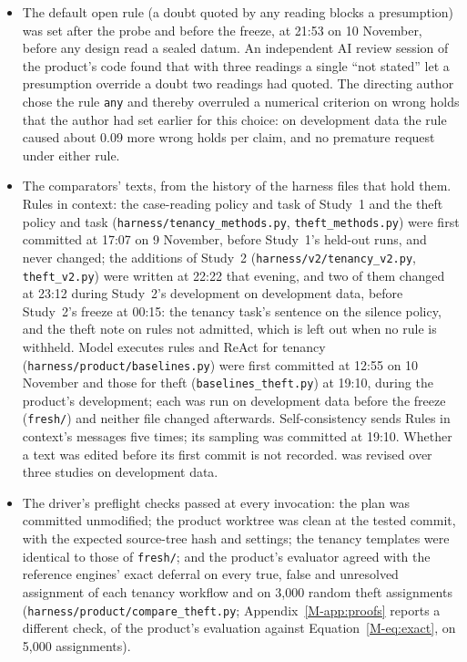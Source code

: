 \begin{itemize}[leftmargin=1.2em,itemsep=1pt]
\item The default open rule (a doubt quoted by any reading blocks a presumption) was set after the probe and before the freeze, at 21:53 on 10 November, before any design read a sealed datum. An independent AI review session of the product's code found that with three readings a single ``not stated'' let a presumption override a doubt two readings had quoted. The directing author chose the rule \texttt{any} and thereby overruled a numerical criterion on wrong holds that the author had set earlier for this choice: on development data the rule caused about 0.09 more wrong holds per claim, and no premature request under either rule.
\item The comparators' texts, from the history of the harness files that hold them. Rules in context: the case-reading policy and task of Study~1 and the theft policy and task (\texttt{harness/\allowbreak{}tenancy\_\allowbreak{}methods.py}, \texttt{theft\_methods.py}) were first committed at 17:07 on 9 November, before Study~1's held-out runs, and never changed; the additions of Study~2 (\texttt{harness/\allowbreak{}v2/\allowbreak{}tenancy\_\allowbreak{}v2.py}, \texttt{theft\_v2.py}) were written at 22:22 that evening, and two of them changed at 23:12 during Study~2's development on development data, before Study~2's freeze at 00:15: the tenancy task's sentence on the silence policy, and the theft note on rules not admitted, which is left out when no rule is withheld. Model executes rules and ReAct for tenancy (\texttt{harness/\allowbreak{}product/\allowbreak{}baselines.py}) were first committed at 12:55 on 10 November and those for theft (\texttt{baselines\_theft.py}) at 19:10, during the product's development; each was run on development data before the freeze (\texttt{fresh/}) and neither file changed afterwards. Self-consistency sends Rules in context's messages five times; its sampling was committed at 19:10. Whether a text was edited before its first commit is not recorded. \casepath was revised over three studies on development data.
\item The driver's preflight checks passed at every invocation: the plan was committed unmodified; the product worktree was clean at the tested commit, with the expected source-tree hash and settings; the tenancy templates were identical to those of \texttt{fresh/}; and the product's evaluator agreed with the reference engines' exact deferral on every true, false and unresolved assignment of each tenancy workflow and on 3,000 random theft assignments (\texttt{harness/\allowbreak{}product/\allowbreak{}compare\_theft.py}; Appendix~\ref{M-app:proofs} reports a different check, of the product's evaluation against Equation~\eqref{M-eq:exact}, on 5,000 assignments).
\end{itemize}

